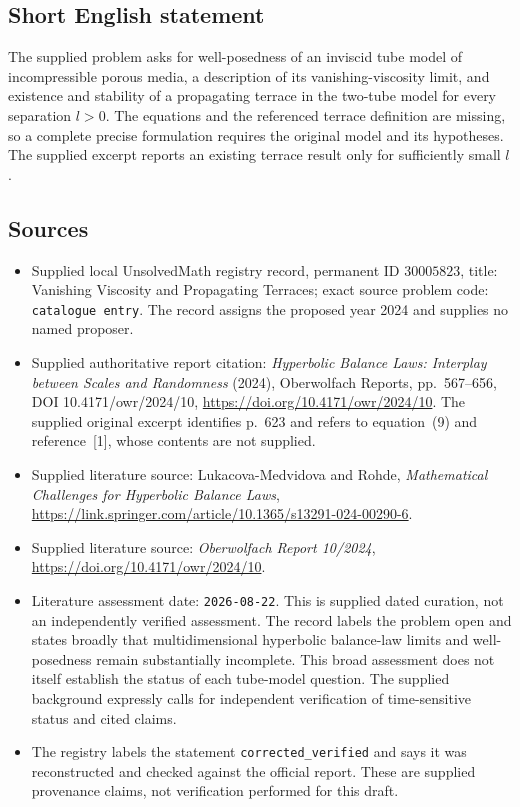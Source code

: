 \documentclass[11pt]{article}
\begin{document}
\subsection{Short English statement}
The supplied problem asks for well-posedness of an inviscid tube model of incompressible porous media, a description of its vanishing-viscosity limit, and existence and stability of a propagating terrace in the two-tube model for every separation \(l>0\). The equations and the referenced terrace definition are missing, so a complete precise formulation requires the original model and its hypotheses. The supplied excerpt reports an existing terrace result only for sufficiently small \(l\).
\subsection{Sources}
\begin{itemize}
\item Supplied local UnsolvedMath registry record, permanent ID \(30005823\), title: Vanishing Viscosity and Propagating Terraces; exact source problem code: \texttt{catalogue entry}. The record assigns the proposed year 2024 and supplies no named proposer.
\item Supplied authoritative report citation: \emph{Hyperbolic Balance Laws: Interplay between Scales and Randomness} (2024), Oberwolfach Reports, pp.~567--656, DOI 10.4171/owr/2024/10, \url{https://doi.org/10.4171/owr/2024/10}. The supplied original excerpt identifies p.~623 and refers to equation~(9) and reference~[1], whose contents are not supplied.
\item Supplied literature source: Lukacova-Medvidova and Rohde, \emph{Mathematical Challenges for Hyperbolic Balance Laws}, \url{https://link.springer.com/article/10.1365/s13291-024-00290-6}.
\item Supplied literature source: \emph{Oberwolfach Report 10/2024}, \url{https://doi.org/10.4171/owr/2024/10}.
\item Literature assessment date: \texttt{2026-08-22}. This is supplied dated curation, not an independently verified assessment. The record labels the problem open and states broadly that multidimensional hyperbolic balance-law limits and well-posedness remain substantially incomplete. This broad assessment does not itself establish the status of each tube-model question. The supplied background expressly calls for independent verification of time-sensitive status and cited claims.
\item The registry labels the statement \texttt{corrected\_verified} and says it was reconstructed and checked against the official report. These are supplied provenance claims, not verification performed for this draft.
\end{itemize}
\end{document}
